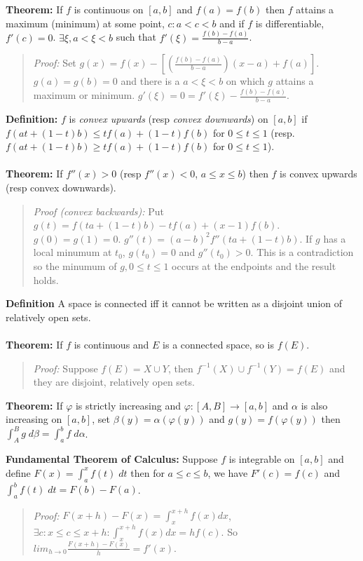 {\bf Theorem:} If $f$ is continuous on $[a,b]$ and $f(a)=f(b)$ then $f$ attains a maximum (minimum) at some point,
$c: a<c<b$ and if $f$ is differentiable, $f'(c)=0$.
$\exists \xi, a < \xi < b$ such that $f'(\xi)= {\frac {f(b)-f(a)} {b-a}}$.
\begin{quote}
\emph{Proof:} Set $g(x)= f(x)-[({\frac {f(b)-f(a)}{b-a}}) (x-a) + f(a)]$.  $g(a)=g(b)=0$ and there is a
$a<\xi<b$ on which $g$ attains a maximum or minimum. $g'(\xi)= 0 = f'(\xi) - {\frac {f(b)-f(a)}{b-a}}$.
\end{quote}
{\bf Definition:} $f$ is \emph{convex upwards} (resp \emph{convex downwards}) on $[a,b]$ if 
$f(at+(1-t)b) \leq tf(a)+(1-t)f(b)$ for $0 \leq t \leq 1$
(resp.  $f(at+(1-t)b) \geq tf(a)+(1-t)f(b)$ for $0 \leq t \leq 1$).
\\
\\
{\bf Theorem:} If $f''(x) > 0$ (resp $f''(x)<0$, $a \leq x \leq b$) then $f$ is 
convex upwards (resp convex downwards).
\begin{quote}
\emph{Proof (convex backwards):} Put $g(t)= f(ta+(1-t)b)-tf(a)+(x-1)f(b)$.  $g(0)=g(1)=0$.
$g''(t)= (a-b)^2f''(ta+(1-t)b)$.  If $g$ has a local minumum at $t_0$,
$g(t_0)= 0$ and $g''(t_0)>0$.  This is a contradiction so the minumum of $g, 0 \leq t \leq 1$
occurs at the endpoints and the result holds.
\end{quote}
{\bf Definition} A space is connected iff it cannot be written as a disjoint union of
relatively open sets.
\\
\\
{\bf Theorem:} If $f$ is continuous and $E$ is a connected space, so is $f(E)$.
\begin{quote}
\emph{Proof:} Suppose $f(E)= X \cup Y$, then $f^{-1}(X) \cup f^{-1}(Y) = f(E)$ and they
are disjoint, relatively open sets.
\end{quote}
{\bf Theorem:} If $\varphi$ is strictly increasing and $\varphi: [A,B] \rightarrow [a,b]$ and $\alpha$ is also
increasing on $[a,b]$, set $\beta(y)= \alpha(\varphi(y))$ and $g(y)= f(\varphi(y))$ then
$\int_A^B g \; d \beta = \int_a^b f \; d \alpha$.
\begin{quote}
\end{quote}
{\bf Fundamental Theorem of Calculus:}   Suppose $f$ is integrable on $[a,b]$ and define
$F(x)= \int_a^x f(t) \; dt$ 
then for $a \leq c \leq b$, we have $F'(c)= f(c)$ and $\int_a^b f(t) \; dt = F(b)-F(a)$.
\begin{quote}
\emph{Proof:}
$F(x+h) - F(x) = \int_{x}^{x + h} f(x) dx$, $\exists c: x \leq c \leq x+h: \int_{x}^{x + h} f(x) dx =h f(c)$.
So $lim_{h \rightarrow 0} {\frac {F(x+h) - F(x)} {h}} = f'(x)$.
\end{quote}
